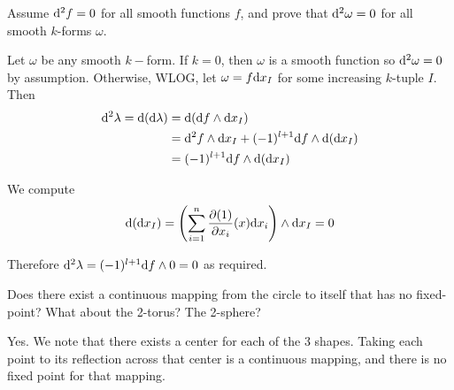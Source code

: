 \documentclass[a4paper, 12pt]{article}
\begin{document}
\begin{problem} 
Assume $\mathrm{d}^2 f = 0$ for all smooth functions $f$, and prove that $\mathrm{d}^2 \omega = 0$ for all smooth $k$-forms $\omega$.
\end{problem}
\begin{solution}
    Let $\omega$ be any smooth $k-$form. If $k = 0$, then $\omega$ is a smooth function so $\mathrm{d}^2 \omega = 0$ by assumption. Otherwise, WLOG, let $\omega = f \mathrm{d} x_I$ for some increasing $k$-tuple $I$. Then 
    \begin{align*}
        \mathrm{d}^2 \lambda = \mathrm{d} (\mathrm{d} \lambda) &= \mathrm{d} (\mathrm{d} f \wedge \mathrm{d} x_I) \\
        &= \mathrm{d}^2 f  \wedge \mathrm{d} x_I + (-1)^{l+1} \mathrm{d} f \wedge \mathrm{d} (\mathrm{d} x_I) \\
        &= (-1)^{l+1} \mathrm{d} f \wedge \mathrm{d} (\mathrm{d} x_I)
    \end{align*}

    We compute \begin{equation*}
        \mathrm{d} (\mathrm{d} x_I) = \left(\sum_{i=1}^{n} \frac{\partial (1)}{\partial x_i}(x) \mathrm{d} x_i\right) \wedge \mathrm{d} x_I = 0
    \end{equation*}

    Therefore $\mathrm{d}^2 \lambda = (-1)^{l+1} \mathrm{d} f \wedge 0 = 0$ as required.
\end{solution}

\begin{problem} 
Does there exist a continuous mapping from the circle to itself that has no fixed-point? What about the 2-torus? The 2-sphere?
\end{problem}
\begin{solution}
    Yes. We note that there exists a center for each of the 3 shapes. Taking each point to its reflection across that center is a continuous mapping, and there is no fixed point for that mapping.
\end{solution}
\end{document}
